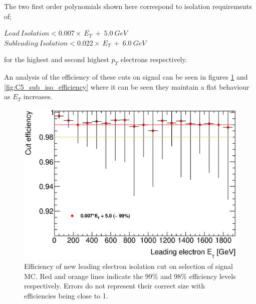 The two first order polynomials shown here correspond to isolation requirements of;
   \begin{center}
   $Lead~Isolation < 0.007\times~E_{T}~+~5.0~GeV$\\
   $Subleading~Isolation < 0.022\times~E_{T}~+~6.0~GeV$\\
   \end{center}
for the highest and second highest $p_{T}$ electrons respectively. 

An analysis of the efficiency of these cuts on signal can be seen in figures \ref{fig:C5_lead_iso_efficiency} and \ref{fig:C5_sub_iso_efficiency} where it can be seen they maintain a flat behaviour as $E_{T}$ increases.


   \begin{figure}[h!]
      \begin{center}
      \includegraphics[scale=0.6]{images/C5_lead_iso_efficiency.eps}
      \end{center}
   \caption{Efficiency of new leading electron isolation cut on selection of signal MC. Red and orange lines indicate the 99\% and 98\% efficiency levels respectively. Errors do not represent their correct size with efficiencies being close to 1.}
   \label{fig:C5_lead_iso_efficiency}
   \end{figure}

